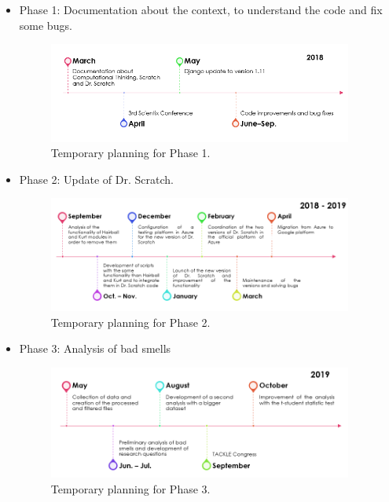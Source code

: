 \begin{itemize}
    \item Phase 1: Documentation about the context, to understand the code and fix some bugs.
    
    \begin{figure}[h]
    \centering
        \includegraphics[width=10cm, keepaspectratio]{img/phase_1.png}
        \caption{Temporary planning for Phase 1.}
        \label{fig:phase_1}
    \end{figure}

    \item Phase 2: Update of Dr. Scratch.
    
    \begin{figure}[h]
    \centering
        \includegraphics[width=10cm, keepaspectratio]{img/phase_2.png}
        \caption{Temporary planning for Phase 2.}
        \label{fig:phase_2}
    \end{figure}
    
    \item Phase 3: Analysis of bad smells
    
    \begin{figure}[h]
    \centering
        \includegraphics[width=10cm, keepaspectratio]{img/phase_3.png}
        \caption{Temporary planning for Phase 3.}
        \label{fig:phase_3}
    \end{figure}
    

\end{itemize}
